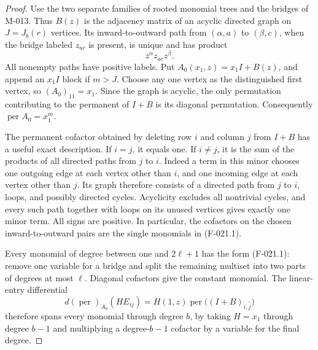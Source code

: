 \begin{proof}
Use the two separate families of rooted monomial trees
and the bridges of M-013. Thus \(B(z)\) is the adjacency
matrix of an acyclic directed graph on \(J=J_b(r)\)
vertices. Its inward-to-outward path from \((\alpha,a)\)
to \((\beta,c)\), when the bridge labeled \(z_{ac}\)
is present, is unique and has product
\[
                         z^\alpha z_{ac}z^\beta.
                                                               \tag{F-021.1}
\]
All nonempty paths have positive labels. Put
\(A_0(x_1,z)=x_1 I+B(z)\), and append an \(x_1 I\)
block if \(m>J\). Choose any one vertex as the distinguished
first vertex, so \((A_0)_{11}=x_1\).
Since the graph is acyclic, the only permutation contributing
to the permanent of \(I+B\) is its diagonal permutation.
Consequently \(\operatorname{per}A_0=x_1^m\).

The permanent cofactor obtained by deleting row \(i\)
and column \(j\) from \(I+B\) has a useful exact
description. If \(i=j\), it equals one. If \(i\ne j\),
it is the sum of the products of all directed paths from
\(j\) to \(i\). Indeed a term in this minor chooses one
outgoing edge at each vertex other than \(i\), and one
incoming edge at each vertex other than \(j\). Its graph
therefore consists of a directed path from \(j\) to \(i\),
loops, and possibly directed cycles. Acyclicity excludes
all nontrivial cycles, and every such path together with
loops on its unused vertices gives exactly one minor term.
All signs are positive. In particular, the cofactors on
the chosen inward-to-outward pairs are the single monomials
in (F-021.1).

Every monomial of degree between one and \(2\ell+1\)
has the form (F-021.1): remove one variable for a bridge
and split the remaining multiset into two parts of degrees
at most \(\ell\). Diagonal cofactors give the constant
monomial. The linear-entry differential
\[
 d(\operatorname{per})_{A_0}(H E_{ij})
       =H(1,z)\operatorname{per}\bigl((I+B)_{\widehat i,
                                                        \widehat j}\bigr)
                                                               \tag{F-021.2}
\]
therefore spans every monomial through degree \(b\), by
taking \(H=x_1\) through degree \(b-1\) and multiplying
a degree-\(b-1\) cofactor by a variable for the final degree.


\end{proof}
